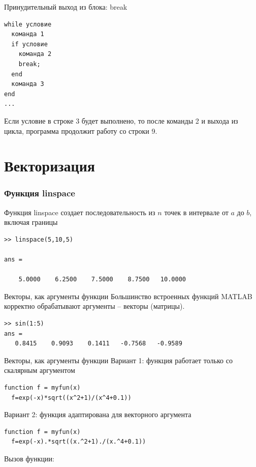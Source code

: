 \documentclass[12pt, compress]{beamer}
\begin{document}
\begin{frame}[fragile]{Принудительный выход из блока: break}    
\begin{lstlisting}
while условие
  команда 1
  if условие
    команда 2
    break;
  end
  команда 3      
end
...
\end{lstlisting}
Если условие в строке 3 будет выполнено, то после команды 2 и выхода из цикла, программа продолжит работу со строки 9.
\end{frame}
%
\section{Векторизация}
%

\begin{frame}[fragile]
\frametitle{Функция linspace}
Функция linspace создает последовательность из $n$ точек в интервале от $a$ до $b$, включая границы
\begin{lstlisting}
>> linspace(5,10,5)

ans =

    5.0000    6.2500    7.5000    8.7500   10.0000
\end{lstlisting}
\end{frame}

\begin{frame}[fragile]{Векторы, как аргументы функции}
Большинство встроенных функций MATLAB корректно обрабатывают аргументы -- векторы (матрицы). 
\begin{lstlisting}
>> sin(1:5)
ans = 
   0.8415    0.9093    0.1411   -0.7568   -0.9589
\end{lstlisting}
\end{frame}

\begin{frame}[fragile]{Векторы, как аргументы функции}
  Вариант 1: функция работает только со скалярным аргументом
\begin{lstlisting}
function f = myfun(x)
  f=exp(-x)*sqrt((x^2+1)/(x^4+0.1))
\end{lstlisting}
Вариант 2: функция адаптирована для векторного аргумента
\begin{lstlisting}
function f = myfun(x)
  f=exp(-x).*sqrt((x.^2+1)./(x.^4+0.1))    
\end{lstlisting}
Вызов функции: 
\end{frame}
\end{document}
